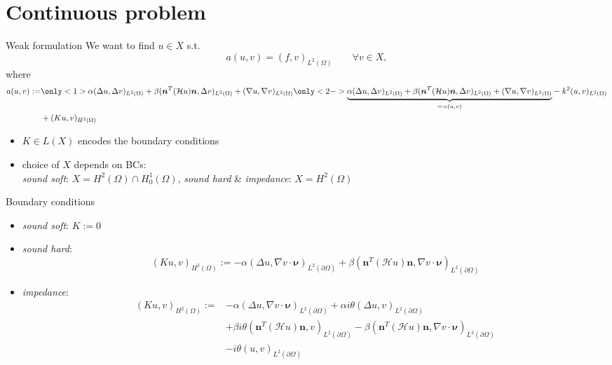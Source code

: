 \documentclass[11pt,aspectratio=169,xcolor=dvipsnames]{beamer}
\newcommand{\nv}{\bm{\nu}}
\newcommand{\nicearrow}[2]{\raisebox{#2}{\resizebox{0.45cm}{!}{\color{#1}{\MVRightArrow}\color{black}}}}
\begin{document}
\section{Continuous problem}
\mysectionpage

\begin{frame}{Weak formulation}
  We want to find $u \in X$ s.t. 
  \begin{equation}
    a(u,v) = (f,v)_{L^2(\Omega)} \qquad \forall v \in X, \tag{CP} \label{CP}
  \end{equation}
  where 
  \begin{align*}
    a(u,v) := &\only<1>{\alpha (\Delta u, \Delta v)_{L^2(\Omega)} + \beta (\bm{n}^T (\mathcal{H} u) \bm{n}, \Delta v)_{L^2(\Omega)} + (\nabla u, \nabla v)_{L^2(\Omega)}}\only<2->{\underbrace{\alpha (\Delta u, \Delta v)_{L^2(\Omega)} + \beta (\bm{n}^T (\mathcal{H} u) \bm{n}, \Delta v)_{L^2(\Omega)} + (\nabla u, \nabla v)_{L^2(\Omega)}}_{=: e(u,v)}} - k^2(u,v)_{L^2(\Omega)} \\
    &+ (Ku,v)_{H^2(\Omega)}
  \end{align*}
  \begin{itemize}
    \item[\nicearrow{GOE}{-0.06cm}] $K \in L(X)$ encodes the boundary conditions
    \item[\nicearrow{GOE}{-0.06cm}] choice of $X$ depends on BCs: \\
    \quad \emph{sound soft}: $X = H^2(\Omega) \cap H^1_0(\Omega)$, \emph{sound hard} \& \emph{impedance}: $X = H^2(\Omega)$
  \end{itemize}
\end{frame}

\begin{frame}{Boundary conditions}
  \begin{itemize}
    \item \emph{sound soft}: $K := 0$
    \item \emph{sound hard}: 
    \begin{equation*}
      (Ku,v)_{H^2(\Omega)} := - \alpha (\Delta u, \nabla v \cdot \nv)_{L^2(\partial \Omega)} + \beta (\bm{n}^T(\mathcal{H} u) \bm{n},\nabla v \cdot \nv)_{L^2(\partial \Omega)} 
    \end{equation*}
    \item \emph{impedance}:
    \begin{equation*}
      \begin{aligned}
        (Ku,v)_{H^2(\Omega)} := &- \alpha (\Delta u, \nabla v \cdot \nv)_{L^2(\partial \Omega)} + \alpha i \theta (\Delta u, v)_{L^2(\partial \Omega)} \\
        &+ \beta i \theta (\bm{n}^T(\mathcal{H} u) \bm{n},v)_{L^2(\partial \Omega)} - \beta (\bm{n}^T(\mathcal{H} u) \bm{n},\nabla v \cdot \nv)_{L^2(\partial \Omega)} \\
        &- i \theta (u,v)_{L^2(\partial \Omega)}
      \end{aligned}
    \end{equation*}
  \end{itemize}
\end{frame}
\end{document}
